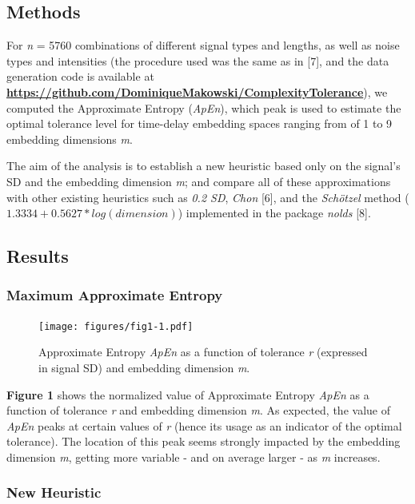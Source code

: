 \documentclass[
  man,floatsintext]{apa6}
\begin{document}
\hypertarget{methods}{%
\subsection{Methods}\label{methods}}

For \emph{n} = 5760 combinations of different signal types and lengths, as well as noise types and intensities (the procedure used was the same as in {[}7{]}, and the data generation code is available at \textbf{\url{https://github.com/DominiqueMakowski/ComplexityTolerance}}), we computed the Approximate Entropy (\emph{ApEn}), which peak is used to estimate the optimal tolerance level for time-delay embedding spaces ranging from of 1 to 9 embedding dimensions \emph{m}.

The aim of the analysis is to establish a new heuristic based only on the signal's SD and the embedding dimension \emph{m}; and compare all of these approximations with other existing heuristics such as \emph{0.2 SD}, \emph{Chon} {[}6{]}, and the \emph{Schötzel} method (\(1.3334 + 0.5627 * log(dimension)\)) implemented in the package \emph{nolds} {[}8{]}.

\hypertarget{results}{%
\subsection{Results}\label{results}}

\hypertarget{maximum-approximate-entropy}{%
\subsubsection{Maximum Approximate Entropy}\label{maximum-approximate-entropy}}

\begin{figure}
\centering
\texttt{[image: figures/fig1-1.pdf]}
\caption{\label{fig:fig1}Approximate Entropy \emph{ApEn} as a function of tolerance \emph{r} (expressed in signal SD) and embedding dimension \emph{m}.}
\end{figure}

\textbf{Figure 1} shows the normalized value of Approximate Entropy \emph{ApEn}
as a function of tolerance \emph{r} and embedding dimension \emph{m}. As expected, the value of \emph{ApEn} peaks at certain values of \emph{r} (hence its usage as an indicator of the optimal tolerance). The location of this peak seems strongly impacted by the embedding dimension \emph{m}, getting more variable - and on average larger - as \emph{m} increases.

\hypertarget{new-heuristic}{%
\subsubsection{New Heuristic}\label{new-heuristic}}
\end{document}
